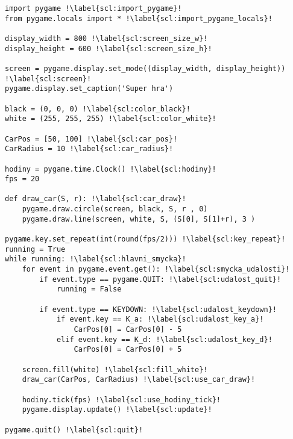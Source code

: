 \begin{minipage}[t]{.45\textwidth}
\begin{code}
\begin{verbatim}
import pygame !\label{scl:import_pygame}!
from pygame.locals import * !\label{scl:import_pygame_locals}!

display_width = 800 !\label{scl:screen_size_w}!
display_height = 600 !\label{scl:screen_size_h}!

screen = pygame.display.set_mode((display_width, display_height)) !\label{scl:screen}!
pygame.display.set_caption('Super hra')

black = (0, 0, 0) !\label{scl:color_black}!
white = (255, 255, 255) !\label{scl:color_white}!

CarPos = [50, 100] !\label{scl:car_pos}!
CarRadius = 10 !\label{scl:car_radius}!

hodiny = pygame.time.Clock() !\label{scl:hodiny}!
fps = 20

def draw_car(S, r): !\label{scl:car_draw}!
    pygame.draw.circle(screen, black, S, r , 0)
    pygame.draw.line(screen, white, S, (S[0], S[1]+r), 3 )

pygame.key.set_repeat(int(round(fps/2))) !\label{scl:key_repeat}!
running = True
while running: !\label{scl:hlavni_smycka}!
    for event in pygame.event.get(): !\label{scl:smycka_udalosti}!
        if event.type == pygame.QUIT: !\label{scl:udalost_quit}!
		    running = False
            
        if event.type == KEYDOWN: !\label{scl:udalost_keydown}!
            if event.key == K_a: !\label{scl:udalost_key_a}!
                CarPos[0] = CarPos[0] - 5
            elif event.key == K_d: !\label{scl:udalost_key_d}!
                CarPos[0] = CarPos[0] + 5
            
    screen.fill(white) !\label{scl:fill_white}!
    draw_car(CarPos, CarRadius) !\label{scl:use_car_draw}!
     
    hodiny.tick(fps) !\label{scl:use_hodiny_tick}!
    pygame.display.update() !\label{scl:update}!

pygame.quit() !\label{scl:quit}!
\end{verbatim}

\label{code:grafika_prvni_hybaci}
\end{code}
\end{minipage}
